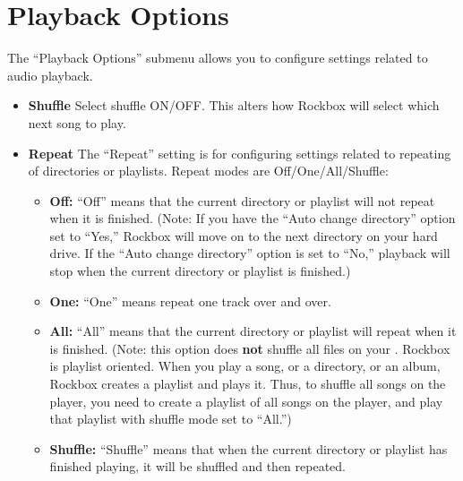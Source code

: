 \section{\label{ref:PlaybackOptions}Playback Options}
  The ``Playback Options'' submenu allows you to configure settings related to audio playback.

  \begin{itemize}
  \item \textbf{Shuffle}
    Select shuffle ON/OFF. This alters how Rockbox will select which next song to play.
  \item \textbf{Repeat}
    The ``Repeat'' setting is for configuring settings related to repeating of directories or playlists.  Repeat modes are Off/One/All/Shuffle:
    \begin{itemize}
    \item \textbf{Off:  }``Off'' means that the current directory or playlist will not repeat when it is finished.  (Note:  If you have the ``Auto change directory'' option set to ``Yes,'' Rockbox will move on to the next directory on your hard drive.  If the ``Auto change directory'' option is set to ``No,'' playback will stop when the current directory or playlist is finished.)
    \item\textbf{One:  }``One'' means repeat one track over and over.
    \item\textbf{All:  } ``All'' means that the current directory or playlist will repeat when it is finished.  (Note:  this option does \textbf{not} shuffle all files on your \dap.  Rockbox is playlist oriented. When you play a song, or a directory, or an album, Rockbox creates a playlist and plays it. Thus, to shuffle all songs on the player, you need to create a playlist of all songs on the player, and play that playlist with shuffle mode set to ``All.'')
    \item\textbf{Shuffle:  }``Shuffle'' means that when the current directory or playlist has finished playing, it will be shuffled and then repeated.
    \end{itemize}


\end{itemize}
